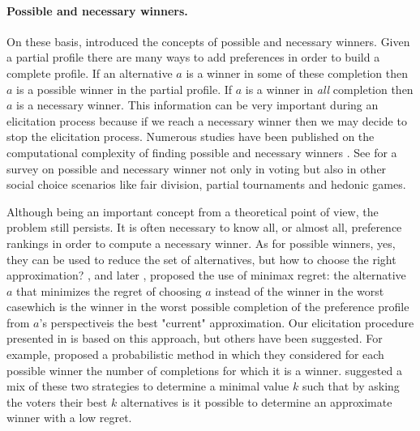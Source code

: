 \paragraph{Possible and necessary winners.}
On these basis, \citet{Konczak05} introduced the concepts of possible and necessary winners. Given a partial profile there are many ways to add preferences in order to build a complete profile. If an alternative $a$ is a winner in some of these completion then $a$ is a possible winner in the partial profile. If $a$ is a winner in \textit{all} completion then $a$ is a necessary winner. This information can be very important during an elicitation process because if we reach a necessary winner then we may decide to stop the elicitation process.
Numerous studies have been published on the computational complexity of finding possible and necessary winners \citep{Konczak05,Pini2007,Walsh2007,Xia2008,Xia2011,Baumeister2012}.
See \citet{Lang2020} for a survey on possible and necessary winner not only in voting but also in other social choice scenarios like fair division, partial tournaments and hedonic games.

Although being an important concept from a theoretical point of view, the problem still persists. It is often necessary to know all, or almost all, preference rankings in order to compute a necessary winner. As for possible winners, yes, they can be used to reduce the set of alternatives, but how to choose the right approximation?
\citet{Boutilier2006}, and later \citet{Lu2011}, proposed the use of minimax regret: the alternative $a$ that minimizes the regret of choosing $a$ instead of the winner in the worst case\textemdash which is the winner in the worst possible completion of the preference profile from $a$'s perspective\textemdash is the best "current" approximation.
Our elicitation procedure presented in  is based on this approach, but others have been suggested.
For example, \citet{Bachrach2010} proposed a probabilistic method in which they considered for each possible winner the number of completions for which it is a winner.
\citet{Lu2011Prob} suggested a mix of these two strategies to determine a minimal value $k$ such that by asking the voters their best $k$ alternatives is it possible to determine an approximate winner with a low regret.
